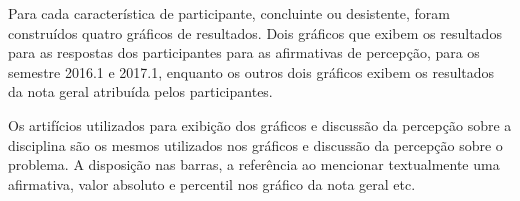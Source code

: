 

Para cada característica de participante, concluinte
ou desistente, foram construídos quatro gráficos
de resultados.
Dois gráficos que exibem os resultados para as respostas
dos participantes para as afirmativas de percepção,
para os semestre 2016.1 e 2017.1, enquanto os outros dois gráficos
exibem os resultados da nota geral atribuída pelos participantes.

Os artifícios utilizados para exibição dos gráficos e
discussão da percepção sobre a disciplina são os mesmos
utilizados nos gráficos e discussão da percepção sobre
o problema.
A disposição nas barras, a referência ao mencionar textualmente
uma afirmativa, valor absoluto e percentil nos gráfico da
nota geral etc.










